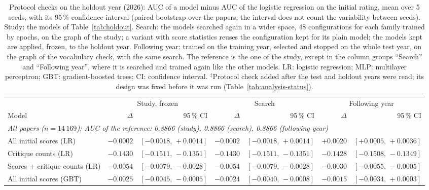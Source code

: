 \begin{table}[t]
\centering
\footnotesize
\setlength{\tabcolsep}{1.2pt}
\caption{Protocol checks on the holdout year (2026): AUC of a model minus AUC of the logistic regression on the initial rating, mean over 5 seeds, with its 95\,\% confidence interval (paired bootstrap over the papers; the interval does not count the variability between seeds). Study: the models of Table~\ref{tab:holdout}. Search: the models searched again in a wider space, 48 configurations for each family trained by epochs, on the graph of the study; a variant with score statistics reuses the configuration kept for its plain model; the models kept are applied, frozen, to the holdout year. Following year: trained on the training year, selected and stopped on the whole test year, on the graph of the vocabulary check, with the same search. The reference is the one of the study, except in the column groups ``Search'' and ``Following year'', where it is searched and trained again like the other models. LR: logistic regression; MLP: multilayer perceptron; GBT: gradient-boosted trees; CI: confidence interval. $^{\ddagger}$Protocol check added after the test and holdout years were read; its design was fixed before it was run (Table~\ref{tab:analysis-status}).}
\label{tab:protocol-holdout}
\begin{tabular}{@{}lrrrrrr@{}}
\toprule
 & \multicolumn{2}{c}{Study, frozen} & \multicolumn{2}{c}{Search} & \multicolumn{2}{c}{Following year} \\
\cmidrule(lr){2-3} \cmidrule(lr){4-5} \cmidrule(lr){6-7}
Model & $\Delta$ & 95\,\% CI & $\Delta$ & 95\,\% CI & $\Delta$ & 95\,\% CI \\
\midrule
\multicolumn{7}{l}{\emph{All papers ($n = 14\,169$); AUC of the reference: 0.8866 (study), 0.8866 (search), 0.8866 (following year)}} \\
All initial scores (LR) & $-0.0002$ & $[-0.0018,\,+0.0014]$ & $-0.0002$ & $[-0.0018,\,+0.0014]$ & $+0.0020$ & $[+0.0005,\,+0.0036]$ \\
Critique counts (LR) & $-0.1430$ & $[-0.1511,\,-0.1351]$ & $-0.1430$ & $[-0.1511,\,-0.1351]$ & $-0.1428$ & $[-0.1508,\,-0.1349]$ \\
Scores + critique counts (LR) & $-0.0054$ & $[-0.0079,\,-0.0028]$ & $-0.0054$ & $[-0.0079,\,-0.0028]$ & $-0.0030$ & $[-0.0055,\,-0.0005]$ \\
All initial scores (GBT) & $-0.0025$ & $[-0.0045,\,-0.0005]$ & $-0.0024$ & $[-0.0040,\,-0.0008]$ & $-0.0015$ & $[-0.0034,\,+0.0003]$ \\

\end{tabular}
\end{table}
